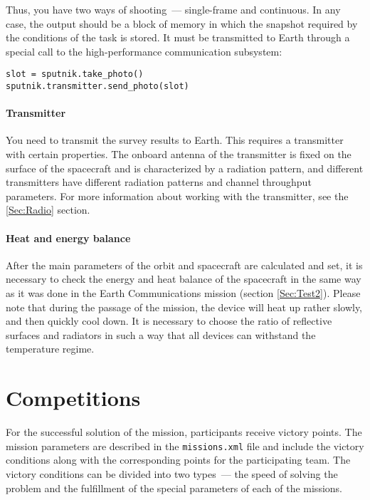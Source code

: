 \documentclass[12pt,a4paper]{article}
\begin{document}
Thus, you have two ways of shooting~--- single-frame and continuous. In any case, the output should be a block of memory in which the snapshot required by the conditions of the task is stored. It must be transmitted to Earth through a special call to the high-performance communication subsystem:

\begin{verbatim}
slot = sputnik.take_photo()
sputnik.transmitter.send_photo(slot)
\end{verbatim}

\paragraph{Transmitter}

You need to transmit the survey results to Earth. This requires a transmitter with certain properties. The onboard antenna of the transmitter is fixed on the surface of the spacecraft and is characterized by a radiation pattern, and different transmitters have different radiation patterns and channel throughput parameters. For more information about working with the transmitter, see the \ref{Sec:Radio} section.

\paragraph{Heat and energy balance}

After the main parameters of the orbit and spacecraft are calculated and set, it is necessary to check the energy and heat balance of the spacecraft in the same way as it was done in the Earth Communications mission (section \ref{Sec:Test2}). Please note that during the passage of the mission, the device will heat up rather slowly, and then quickly cool down. It is necessary to choose the ratio of reflective surfaces and radiators in such a way that all devices can withstand the temperature regime.

\clearpage
\section{Competitions}

For the successful solution of the mission, participants receive victory points. The mission parameters are described in the \verb'missions.xml' file and include the victory conditions along with the corresponding points for the participating team. The victory conditions can be divided into two types~--- the speed of solving the problem and the fulfillment of the special parameters of each of the missions.
\end{document}
